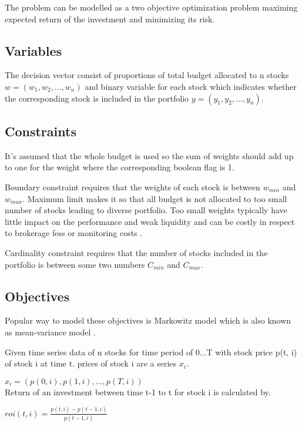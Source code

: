 \documentclass[11pt]{article} %
\begin{document}
The problem can be modelled as a two objective optimization problem maximing expected return of the investment and minimizing its risk. 

\subsection{Variables}

The decision vector consist of proportions of total budget allocated to n stocks $w = (w_1, w_2, ..., w_n)$ and binary variable for each stock which indicates whether the corresponding stock is included in the portfolio $y=(y_1, y_2,..., y_n)$. 

\subsection{Constraints}

It's assumed that the whole budget is used so the sum of weights should add up to one for the weight where the corresponding boolean flag is 1.

Boundary constraint requires that the weights of each stock is between $w_{min}$ and $w_{max}$. Maximum limit makes it so that all budget is not allocated to too small number of stocks leading to diverse portfolio. Too small weights typically have little impact on the performance and weak liquidity and can be costly in respect to brokerage fess or monitoring costs \cite{ertenlice2018survey}.

Cardinality constraint requires that the number of stocks included in the portfolio is between some two numbers $C_{min}$ and $C_{max}$. 

\subsection{Objectives}

Popular way to model these objectives is Markowitz model which is also known as mean-variance model \cite{kolm201460}.

Given time series data of n stocks for time period of 0...T with stock price p(t, i) of stock i at time t. prices of stock i are a series $x_i$.

$x_i = (p(0, i), p(1, i), ..., p(T, i))$\\

Return of an investment between time t-1 to t for stock i is calculated by.

$roi(t,i) = \frac{p(t,i) - p(t-1,i)}{p(t-1,i)}$
\end{document}
